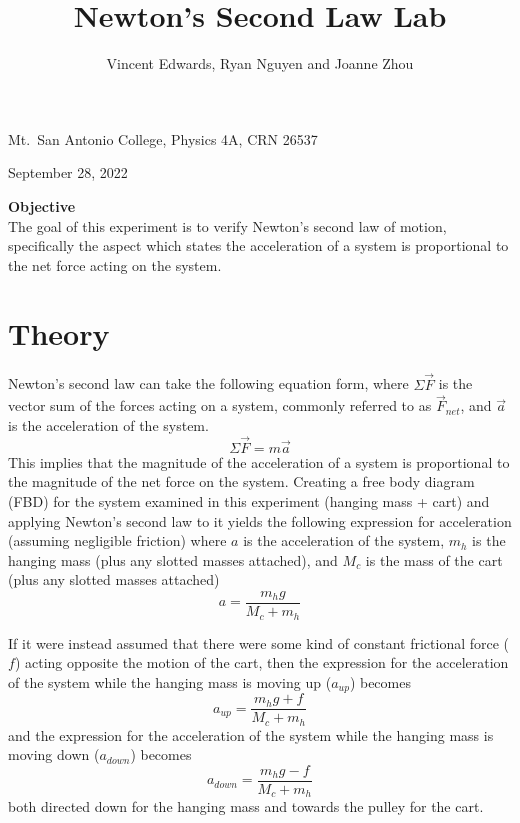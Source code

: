 \documentclass[12pt]{iopart}
\begin{document}
\title{Newton's Second Law Lab}

\author{Vincent Edwards, Ryan Nguyen and Joanne Zhou}

\vspace{10pt}
\begin{indented}
  \item[]Mt.~San Antonio College, Physics 4A, CRN 26537
  \item[]September 28, 2022
  \vspace{10pt}
  \item[]\textbf{Objective}\\
    The goal of this experiment is to verify Newton's second law of motion, specifically the aspect which states the acceleration of a system is proportional to the net force acting on the system.
\end{indented}

\section{Theory}
Newton's second law can take the following equation form, where $\Sigma \vec F$ is the vector sum of the forces acting on a system, commonly referred to as $\vec F_{net}$, and $\vec a$ is the acceleration of the system.
\begin{equation}
\Sigma \vec F = m \vec a
\end{equation}
This implies that the magnitude of the acceleration of a system is proportional to the magnitude of the net force on the system.
Creating a free body diagram (FBD) for the system examined in this experiment (hanging mass + cart) and applying Newton's second law to it yields the following expression for acceleration (assuming negligible friction) where $a$ is the acceleration of the system, $m_h$ is the hanging mass (plus any slotted masses attached), and $M_c$ is the mass of the cart (plus any slotted masses attached)
\begin{equation}
a = \frac{m_h g}{M_c + m_h} \label{eq:acceleration}
\end{equation}

If it were instead assumed that there were some kind of constant frictional force ($f$) acting opposite the motion of the cart, then the expression for the acceleration of the system while the hanging mass is moving up ($a_{up}$) becomes
\begin{equation}
a_{up} = \frac{m_h g + f}{M_c + m_h}
\end{equation}
and the expression for the acceleration of the system while the hanging mass is moving down ($a_{down}$) becomes
\begin{equation}
a_{down} = \frac{m_h g - f}{M_c + m_h}
\end{equation}
both directed down for the hanging mass and towards the pulley for the cart. 
\end{document}
